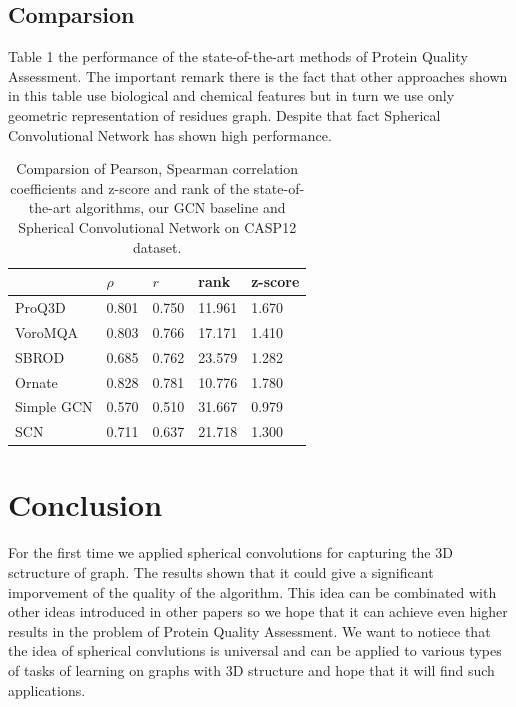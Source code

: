 \documentclass[12pt,twoside]{article}
\begin{document}
	\subsection{Comparsion}
	Table 1 the performance of the state-of-the-art methods of Protein Quality Assessment. The important remark there is
	the fact that other approaches shown in this table use biological and chemical features but in turn we use only geometric representation
	of residues graph. Despite that fact Spherical Convolutional Network has shown high performance.
	\begin{center}
		\begin{table}[H]
			\centering
			\begin{tabular}{l|l|l|l|l}
				\hline
					   & $\rho$ &  $r$     &   rank       & z-score \\ \hline
			ProQ3D     & 0.801  &  0.750   &   11.961     & 1.670       \\
			VoroMQA    & 0.803  &  0.766   &   17.171     & 1.410       \\  
			SBROD      & 0.685  &  0.762   &   23.579     & 1.282       \\
			Ornate     & 0.828  &  0.781   &   10.776     & 1.780       \\
			Simple GCN & 0.570  &  0.510   &   31.667     & 0.979       \\
			SCN        & 0.711  &  0.637   &   21.718     & 1.300       
		\end{tabular}
		\caption{Comparsion of Pearson, Spearman correlation coefficients and z-score and rank of the state-of-the-art algorithms,
			our GCN baseline and Spherical Convolutional Network on CASP12 dataset.
			}
		\label{Tab:1}
		\end{table}
	\end{center}

	\section{Conclusion}
	For the first time we applied spherical convolutions for capturing the 3D sctructure of graph. The results shown that it could
	give a significant imporvement of the quality of the algorithm. This idea can be combinated with other ideas introduced in other papers
	\cite{Pages2019}\cite{Baldassarre2020GRAPHQAPM}\cite{Uziela2016} so we hope that it can achieve even higher results in the problem
	of Protein Quality Assessment. We want to notiece that the idea of spherical convlutions is universal and can be applied to
	various types of tasks of learning on graphs with 3D structure and hope that it will find such applications.
\end{document}
